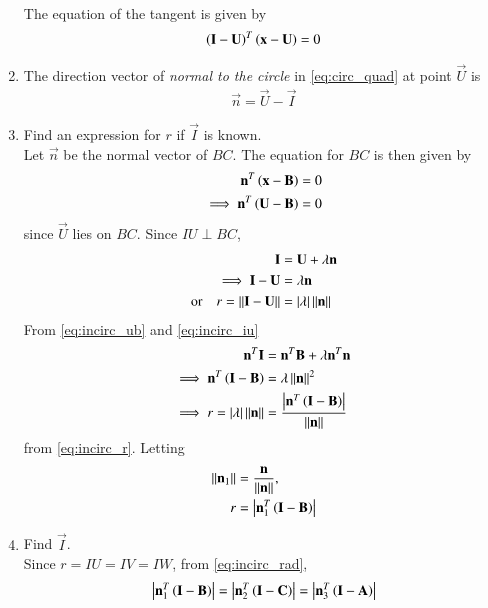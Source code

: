\begin{enumerate}[label=\arabic*.,ref=\thesubsection.\theenumi]
\\
\solution The equation of the tangent is given by 
\begin{align}
\left(\mathbf{I}-\mathbf{U}\right)^T\left(\mathbf{x}-\mathbf{U}\right)=0
\end{align}
%
\item The direction vector of {\em normal to the circle}  in \eqref{eq:circ_quad} at point $\vec{U}$ is
\begin{align}
\label{eq:circ_normal}
\vec{n} = \vec{U}-\vec{I}
\end{align}
%
\item Find an expression for $r$ if $\vec{I}$ is known.
\\
\solution Let $\vec{n}$ be the normal vector of $BC$.  The equation for $BC$ is then given by
\begin{align}
\mathbf{n}^T\left(\mathbf{x}-\mathbf{B}\right) &= 0
\\
\implies \mathbf{n}^T\left(\mathbf{U}-\mathbf{B}\right) &= 0
\label{eq:incirc_ub}
\end{align}
since $\vec{U}$ lies on $BC$.
Since $IU \perp BC$, 
\begin{align}
\label{eq:incirc_iu}
\mathbf{I}&=\mathbf{U}+\lambda\mathbf{n}
\\
\implies \mathbf{I}-\mathbf{U}&=\lambda\mathbf{n}
\\
\text{or}\quad r=\left\lVert\mathbf{I}-\mathbf{U}\right\rVert&=\left\vert\lambda\right\vert\left\lVert\mathbf{n}\right\rVert
\label{eq:incirc_r}
\end{align}
From \eqref{eq:incirc_ub} and \eqref{eq:incirc_iu}
\begin{align}
\mathbf{n}^T\mathbf{I}&=\mathbf{n}^T\mathbf{B}+\lambda\mathbf{n}^T\mathbf{n}
\\
\implies \mathbf{n}^T\left(\mathbf{I}-\mathbf{B}\right)&=\lambda\left\lVert\mathbf{n}\right\rVert^2
\\
\implies r = \left\vert\lambda\right\vert\left\lVert\mathbf{n}\right\rVert&=\frac{\left\vert\mathbf{n}^T\left(\mathbf{I}-\mathbf{B}\right)\right\vert}{\left\lVert\mathbf{n}\right\rVert}
\end{align}
from \eqref{eq:incirc_r}.  Letting 
\begin{align}
\left\lVert\mathbf{n}_1\right\rVert&= \frac{\mathbf{n}}{\left\lVert\mathbf{n}\right\rVert},
\\
r &= \left\vert\mathbf{n}_1^T\left(\mathbf{I}-\mathbf{B}\right)\right\vert
\label{eq:incirc_rad}
\end{align}
\item Find $\vec{I}$.
\\
\solution Since $r = IU = IV = IW$, from \eqref{eq:incirc_rad},
\begin{align}
\abs{\vec{n}_1^T\brak{\vec{I}-\vec{B}}} = \abs{\vec{n}_2^T\brak{\vec{I}-\vec{C}}} = 
\abs{\vec{n}_3^T\brak{\vec{I}-\vec{A}}}

\end{align}
\end{enumerate}
